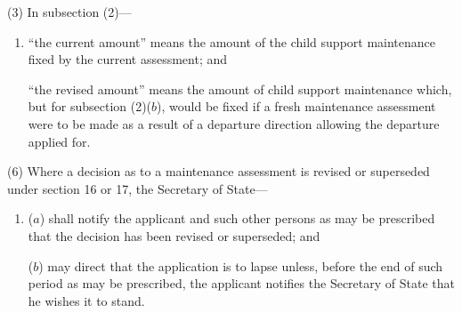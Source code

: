 \documentclass[12pt,a4paper]{article}
\begin{document}
(3) In subsection (2)—
\begin{enumerate}\item[]
    “the current amount” means the amount of the child support maintenance fixed by the current assessment; and

    “the revised amount” means the amount of child support maintenance which, but for subsection (2)($b$), would be fixed if a fresh maintenance assessment were to be made as a result of a departure direction allowing the departure applied for. 
\end{enumerate}

%
%
%

(6) Where a decision as to a maintenance assessment is revised or superseded under section 16 or 17, the Secretary of State—
\begin{enumerate}\item[]
($a$) shall notify the applicant and such other persons as may be prescribed that the decision has been revised or superseded; and

($b$) may direct that the application is to lapse unless, before the end of such period as may be prescribed, the applicant notifies the Secretary of State that he wishes it to stand.
\end{enumerate}
\end{document}
